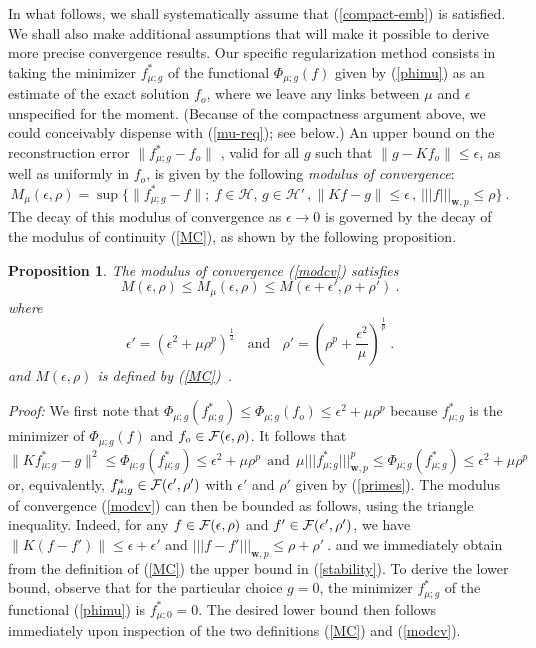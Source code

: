 \documentclass[10pt]{article}
\newtheorem{proposition}[theorem]{Proposition}
\newcommand{\QED}{\hfill \raisebox{-2pt}{\rule{5.6pt}{8pt}\rule{4pt}{0pt}}%
  \smallskip\par}
\def\cH{\mathcal{H}}
\newcommand\eref[1]{(\ref{#1})}
\def\Vvert{\vert\!\vert\!\vert}
\begin{document}
In what follows, we shall systematically assume that \eref{compact-emb}
is satisfied. We shall also make additional assumptions that will make it
possible to derive more precise convergence results.
Our specific regularization method consists in taking the
minimizer $f^*_{\mu;g}$ of the functional
$\Phi_{\mu; g}(f )$ given by
(\ref{phimu}) as
an estimate of the exact solution $f_o$, where we
leave any links between $\mu$ and $\epsilon$ unspecified for
the moment. (Because of the compactness argument above, we could
conceivably dispense with \eref{mu-req}; see below.) An upper
bound on the reconstruction error $\| f^*_{\mu;g} - f_o \|$ ,
valid for all $g$ such that $\|g-Kf_o\| \le \epsilon$, as well as uniformly
in $f_o$, is
given by the following {\it modulus of convergence}:
\begin{equation}
M_\mu(\epsilon,\rho) = \sup\{ \| f^*_{\mu;g} -f\|;\ f \in \cH,\, g \in \cH'
\, ,
\| Kf - g \| \leq \epsilon\, ,\, \Vvert f \Vvert_{\mathbf{w},p} \leq \rho \}\ .
\label{modcv}
\end{equation}
The decay of this modulus of convergence as $\epsilon \to 0$ is governed by the
decay of the modulus of continuity \eref{MC}, as shown by the following
proposition.
\begin{proposition}
\label{bestcv}
The modulus of convergence {\rm \eref{modcv}} satisfies
\begin{equation}
M(\epsilon,\rho) \leq M_\mu(\epsilon,\rho) \leq M(\epsilon
+\epsilon',\rho + \rho')\ .
\label{stability}
\end{equation}
where
\begin{equation}
\epsilon' = \left(\epsilon^2 +\mu \rho^p\right)^{\frac{1}{2}}
~~~~\mbox{and}~~~~
\rho' = \left(\rho^p + \frac{\epsilon^2}{\mu}\right)^{\frac{1}{p}}\ .
\label{primes}
\end{equation}
and $M(\epsilon,\rho)$ is defined by {\rm \eref{MC}}\ .
\end{proposition}
{\em Proof:} We first note
that $\Phi_{\mu ; g}(f^*_{\mu;g}) \leq\Phi_{\mu;g}(f_o) \leq \epsilon^2 + \mu
\rho^p$ because $f^*_{\mu;g}$ is the minimizer of $\Phi_{\mu ; g}(f)$
and $f_o \in {\cal F}(\epsilon, \rho)$.
It follows that
$$
\| Kf^*_{\mu;g} - g\|^2 \leq \Phi_{\mu; g}(f^*_{\mu;g}) \le
\epsilon^2 + \mu \rho^p  ~~\mbox{and}~~
\mu  \Vvert f^*_{\mu;g}\Vvert_{\mathbf{w},p}^p \leq \Phi_{\mu; g}(f^*_{\mu;g} )
 \le \epsilon^2 + \mu \rho^p
$$
or, equivalently, $f^*_{\mu;g} \in {\cal F}(\epsilon',\rho')$ with
$\epsilon'$ and $\rho'$ given by \eref{primes}.
The modulus of convergence (\ref{modcv}) can then be bounded as follows,
using the
triangle inequality. Indeed, for any $f \in {\cal F}(\epsilon,\rho)$ and
$f' \in {\cal F}(\epsilon',\rho')$, we have
$
\| K(f - f') \|
\leq \epsilon+\epsilon'
$
and
$
\Vvert f - f' \Vvert_{\mathbf{w},p} \leq \rho+\rho'\ .
$
and we immediately obtain from the definition of (\ref{MC}) the
upper bound in (\ref{stability}). To derive the lower bound, observe that
for the
particular choice $g=0$,
the minimizer $f^*_{\mu;g}$ of the functional (\ref{phimu}) is
$f^*_{\mu;0}=0$. The desired lower bound then follows immediately upon
inspection
of the two definitions \eref{MC} and \eref{modcv}. \hfill\QED
\end{document}
